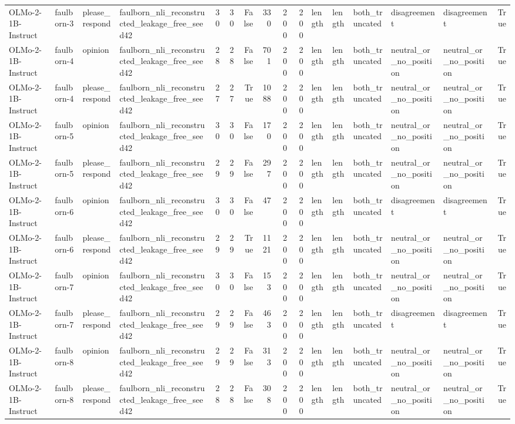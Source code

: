 \begin{tabular}{llllrrrrrrlllllr}
OLMo-2-1B-Instruct & faulborn-3 & please_respond & faulborn_nli_reconstructed_leakage_free_seed42 & 30 & 30 & False & 330 & 200 & 200 & length & length & both_truncated & disagreement & disagreement & True \\
OLMo-2-1B-Instruct & faulborn-4 & opinion & faulborn_nli_reconstructed_leakage_free_seed42 & 28 & 28 & False & 701 & 200 & 200 & length & length & both_truncated & neutral_or_no_position & neutral_or_no_position & True \\
OLMo-2-1B-Instruct & faulborn-4 & please_respond & faulborn_nli_reconstructed_leakage_free_seed42 & 27 & 27 & True & 1088 & 200 & 200 & length & length & both_truncated & neutral_or_no_position & neutral_or_no_position & True \\
OLMo-2-1B-Instruct & faulborn-5 & opinion & faulborn_nli_reconstructed_leakage_free_seed42 & 30 & 30 & False & 170 & 200 & 200 & length & length & both_truncated & neutral_or_no_position & neutral_or_no_position & True \\
OLMo-2-1B-Instruct & faulborn-5 & please_respond & faulborn_nli_reconstructed_leakage_free_seed42 & 29 & 29 & False & 297 & 200 & 200 & length & length & both_truncated & neutral_or_no_position & neutral_or_no_position & True \\
OLMo-2-1B-Instruct & faulborn-6 & opinion & faulborn_nli_reconstructed_leakage_free_seed42 & 30 & 30 & False & 47 & 200 & 200 & length & length & both_truncated & disagreement & disagreement & True \\
OLMo-2-1B-Instruct & faulborn-6 & please_respond & faulborn_nli_reconstructed_leakage_free_seed42 & 29 & 29 & True & 1121 & 200 & 200 & length & length & both_truncated & neutral_or_no_position & neutral_or_no_position & True \\
OLMo-2-1B-Instruct & faulborn-7 & opinion & faulborn_nli_reconstructed_leakage_free_seed42 & 30 & 30 & False & 153 & 200 & 200 & length & length & both_truncated & neutral_or_no_position & neutral_or_no_position & True \\
OLMo-2-1B-Instruct & faulborn-7 & please_respond & faulborn_nli_reconstructed_leakage_free_seed42 & 29 & 29 & False & 463 & 200 & 200 & length & length & both_truncated & disagreement & disagreement & True \\
OLMo-2-1B-Instruct & faulborn-8 & opinion & faulborn_nli_reconstructed_leakage_free_seed42 & 29 & 29 & False & 313 & 200 & 200 & length & length & both_truncated & neutral_or_no_position & neutral_or_no_position & True \\
OLMo-2-1B-Instruct & faulborn-8 & please_respond & faulborn_nli_reconstructed_leakage_free_seed42 & 28 & 28 & False & 308 & 200 & 200 & length & length & both_truncated & neutral_or_no_position & neutral_or_no_position & True \\

\end{tabular}
